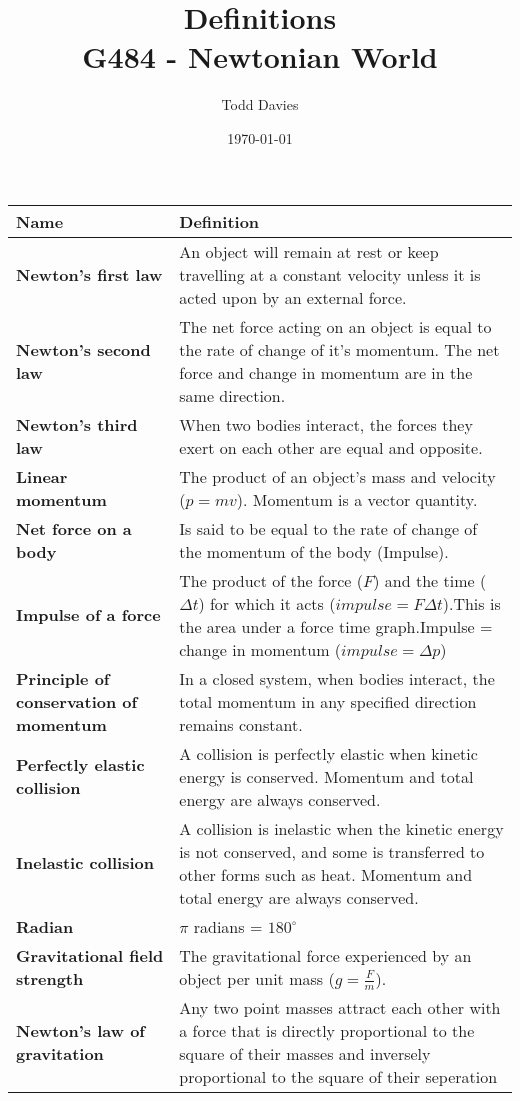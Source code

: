 \documentclass{article}
\title{Definitions \\ \large{G484 - Newtonian World}}
\author{Todd Davies}
\date{\today}
\begin{document}
\lhead{\today}

\maketitle

\thispagestyle{empty}

\begin{tabularx}{\textwidth}{>{\bf\centering\arraybackslash}m{1in} | X}
  \large{Name} & \large{\textbf{Definition}}\\ \hline
  Newton's first law & An object will remain at rest or keep 
  	travelling at a constant velocity unless it is acted upon by an external 
  	force.\\ \hline
  Newton's second law & The net force acting on an object is equal
  	to the rate of change of it's momentum. The net force and change in momentum
  	are in the same direction.\\ \hline
  Newton's third law & When two bodies interact, the forces they
  	exert on each other are equal and opposite.\\ \hline
  Linear momentum & The product of an object's mass and velocity
  	($p=mv$). Momentum is a vector quantity.\\ \hline
  Net force on a body & Is said to be equal to the rate of change
  	of the momentum of the body (Impulse).\\ \hline
  Impulse of a force & The product of the force ($F$) and the time ($\Delta t$)
  	for which it acts ($impulse = F \Delta t$).\newline \newline This is the
  	area under a force time graph.\newline \newline Impulse = change in momentum
  	($impulse = \Delta p$)\\ \hline
  Principle of conservation of momentum & In a closed system, when bodies
  	interact, the total momentum in any specified direction remains constant.\\
  	\hline
  Perfectly elastic collision & A collision is perfectly elastic
  	when kinetic energy is conserved. Momentum and total energy are always
  	conserved.\\ \hline
  Inelastic collision & A collision is inelastic when the kinetic
  	energy is not conserved, and some is transferred to other forms such as
  	heat. Momentum and total energy are always conserved.\\ \hline
  Radian & $\pi$ radians = $180^\circ$\\ \hline
  Gravitational field strength & The gravitational force 
  	experienced by an object per unit mass ($g = \frac{F}{m}$).\\ \hline
  Newton's law of gravitation & Any two point masses attract each other with a force that is directly proportional to the square of their masses and inversely proportional to the square of their seperation\\ \hline
\end{tabularx}
\end{document}
